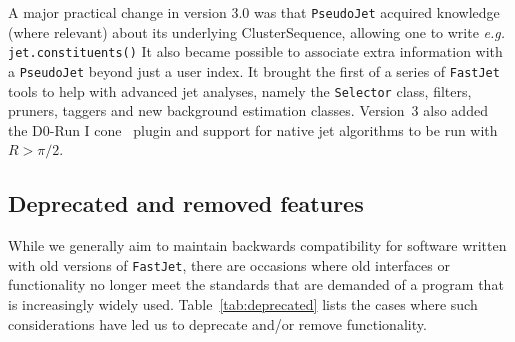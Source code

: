 \documentclass[12pt,a4]{article}
\newcommand{\fastjet}{\texttt{FastJet}\xspace}
\newcommand{\ttt}[1]{{\small\texttt{#1}}}
\begin{document}
A major practical change in version 3.0 was that \ttt{PseudoJet}
acquired knowledge 
(where relevant) about its underlying ClusterSequence, allowing one to
write {\em e.g.}  \ttt{jet.constituents()}
%
It also became possible to associate extra information with a
\ttt{PseudoJet} beyond just a user index.
%
It brought the first of a series of \fastjet tools to help with
advanced jet analyses, namely the \ttt{Selector} class, filters,
  pruners, taggers and new background estimation classes.
%
Version~3 also added the D0-Run I cone~\cite{Abbott:1997fc} plugin and
support for native jet algorithms to be run with $R>\pi/2$.


\subsection{Deprecated and removed features}
\label{sec:deprecated}

While we generally aim to maintain backwards compatibility for
software written with old versions of \fastjet, there are occasions
where old interfaces or functionality no longer meet the standards that
are demanded of a program that is increasingly widely used.
%
Table~\ref{tab:deprecated} lists the cases where such considerations
have led us to deprecate and/or remove functionality.
\end{document}
